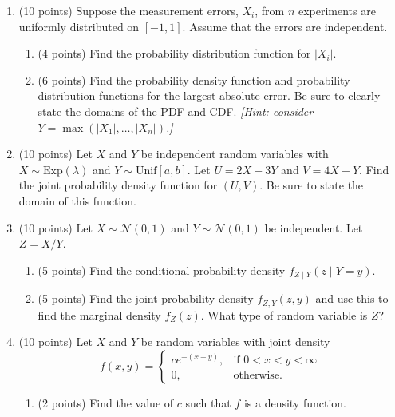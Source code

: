 \documentclass[11pt]{article}
\theoremstyle{plain}
\newcommand{\Unif}{\ensuremath{\textrm{Unif}}}
\newcommand{\Exp}{\ensuremath{\textrm{Exp}}}
\begin{document}
\begin{enumerate}
    \item (10 points)
    Suppose the measurement errors, $X_i$, from $n$ experiments are uniformly distributed on $[-1, 1]$.
    Assume that the errors are independent.
    \begin{enumerate}
        \item (4 points)
        Find the probability distribution function for $|X_i|$.

        \vfill

        \item (6 points)
        Find the probability density function and probability distribution functions for the largest absolute error.
        Be sure to clearly state the domains of the PDF and CDF.
        \emph{[Hint: consider $Y = \max(|X_1|, \ldots, |X_n|)$.]}

        \vfill
    \end{enumerate}

    \newpage

    \item (10 points)
    Let $X$ and $Y$ be independent random variables with $X\sim \Exp(\lambda)$ and $Y\sim \Unif [a,b]$.
    Let $U = 2X-3Y$ and $V = 4X+Y$.
    Find the joint probability density function for $(U, V)$.
    Be sure to state the domain of this function.

    \newpage

    \item (10 points)
    Let $X\sim \mathcal{N}(0, 1)$ and $Y\sim \mathcal{N}(0, 1)$ be independent.
    Let $Z = X/Y$.
    \begin{enumerate}
    \item (5 points)
    Find the conditional probability density $f_{Z\mid Y}(z\mid Y=y)$.
    \vfill

    \item (5 points)
    Find the joint probability density $f_{Z, Y}(z, y)$ and use this to find the marginal density $f_Z(z)$.
    What type of random variable is $Z$?
    \vfill

    \end{enumerate}

    \newpage

    \item (10 points)
    Let $X$ and $Y$ be random variables with joint density
    \[
        f(x,y) = \begin{cases}
            ce^{-(x+y)},&\text{if }0<x<y<\infty\\
            0,&\text{otherwise.}
        \end{cases}
    \]
    \begin{enumerate}
        \item (2 points)
        Find the value of $c$ such that $f$ is a density function.


\end{enumerate}
\end{enumerate}
\end{document}
